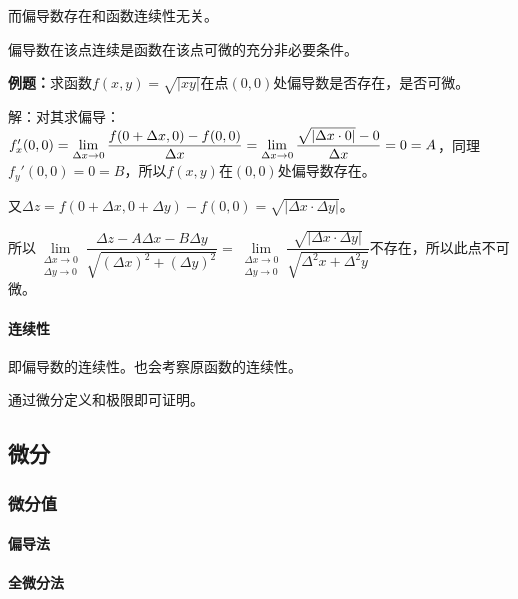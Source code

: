 \documentclass[UTF8, 12pt]{ctexart}
\begin{document}
而偏导数存在和函数连续性无关。

偏导数在该点连续是函数在该点可微的充分非必要条件。

\textbf{例题：}求函数$f(x,y)=\sqrt{\vert xy\vert}$在点$(0,0)$处偏导数是否存在，是否可微。

解：对其求偏导：$f_x'(0,0)=\lim\limits_{\Delta x\to0}\dfrac{f(0+\Delta x,0)-f(0,0)}{\Delta x}=\lim\limits_{\Delta x\to0}\dfrac{\sqrt{\vert\Delta x\cdot0\vert}-0}{\Delta x}\\=0=A$，同理$f_y'(0,0)=0=B$，所以$f(x,y)$在$(0,0)$处偏导数存在。

又$\Delta z=f(0+\Delta x,0+\Delta y)-f(0,0)=\sqrt{\vert\Delta x\cdot\Delta y\vert}$。

所以$\lim\limits_{\substack{\Delta x\to0\\\Delta y\to0}}\dfrac{\Delta z-A\Delta x-B\Delta y}{\sqrt{(\Delta x)^2+(\Delta y)^2}}=\lim\limits_{\substack{\Delta x\to0\\\Delta y\to0}}\dfrac{\sqrt{\vert\Delta x\cdot\Delta y\vert}}{\sqrt{\Delta^2x+\Delta^2y}}$不存在，所以此点不可微。

\paragraph{连续性} \leavevmode \medskip

即偏导数的连续性。也会考察原函数的连续性。

通过微分定义和极限即可证明。


\subsection{微分}

\subsubsection{微分值}

\paragraph{偏导法} \leavevmode \medskip

\paragraph{全微分法} \leavevmode \medskip
\end{document}

